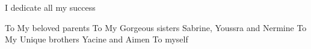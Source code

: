 \centering
I dedicate all my success

To My beloved parents 
To My Gorgeous sisters Sabrine, Youssra and Nermine
To My Unique brothers Yacine and Aimen
To myself